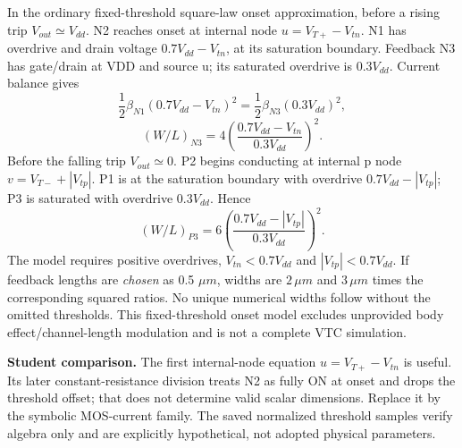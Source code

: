 \documentclass[10pt]{article}
\begin{document}
In the ordinary fixed-threshold square-law onset approximation, before a rising trip $V_{out}\simeq V_{dd}$. N2 reaches onset at internal node $u=V_{T+}-V_{tn}$. N1 has overdrive and drain voltage $0.7V_{dd}-V_{tn}$, at its saturation boundary. Feedback N3 has gate/drain at VDD and source u; its saturated overdrive is $0.3V_{dd}$. Current balance gives
\[\frac12\beta_{N1}(0.7V_{dd}-V_{tn})^2=\frac12\beta_{N3}(0.3V_{dd})^2,\]
\[\boxed{(W/L)_{N3}=4\left(\frac{0.7V_{dd}-V_{tn}}{0.3V_{dd}}\right)^2.}\]
Before the falling trip $V_{out}\simeq0$. P2 begins conducting at internal p node $v=V_{T-}+|V_{tp}|$. P1 is at the saturation boundary with overdrive $0.7V_{dd}-|V_{tp}|$; P3 is saturated with overdrive $0.3V_{dd}$. Hence
\[\boxed{(W/L)_{P3}=6\left(\frac{0.7V_{dd}-|V_{tp}|}{0.3V_{dd}}\right)^2.}\]
The model requires positive overdrives, $V_{tn}<0.7V_{dd}$ and $|V_{tp}|<0.7V_{dd}$. If feedback lengths are \emph{chosen} as 0.5 $\mu m$, widths are $2\,\mu m$ and $3\,\mu m$ times the corresponding squared ratios. No unique numerical widths follow without the omitted thresholds. This fixed-threshold onset model excludes unprovided body effect/channel-length modulation and is not a complete VTC simulation.

\textbf{Student comparison.} The first internal-node equation $u=V_{T+}-V_{tn}$ is useful. Its later constant-resistance division treats N2 as fully ON at onset and drops the threshold offset; that does not determine valid scalar dimensions. Replace it by the symbolic MOS-current family. The saved normalized threshold samples verify algebra only and are explicitly hypothetical, not adopted physical parameters.
\end{document}
